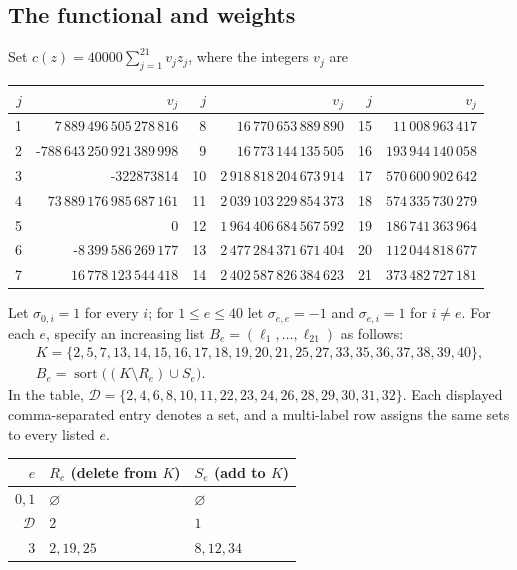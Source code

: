 \documentclass[11pt]{article}
\theoremstyle{remark}
\begin{document}
\begin{appendices}
\subsection*{The functional and weights}
Set $c(z)=40000\sum_{j=1}^{21}v_jz_j$, where the integers $v_j$ are
\begin{center}\small
\setlength{\tabcolsep}{5pt}
\begin{tabular}{r r|r r|r r}
$j$&$v_j$&$j$&$v_j$&$j$&$v_j$\\\hline
1&$7\,889\,496\,505\,278\,816$&8&$16\,770\,653\,889\,890$&15&$11\,008\,963\,417$\\
2&-$788\,643\,250\,921\,389\,998$&9&$16\,773\,144\,135\,505$&16&$193\,944\,140\,058$\\
3&-322873814&10&$2\,918\,818\,204\,673\,914$&17&$570\,600\,902\,642$\\
4&$73\,889\,176\,985\,687\,161$&11&$2\,039\,103\,229\,854\,373$&18&$574\,335\,730\,279$\\
5&0&12&$1\,964\,406\,684\,567\,592$&19&$186\,741\,363\,964$\\
6&-$8\,399\,586\,269\,177$&13&$2\,477\,284\,371\,671\,404$&20&$112\,044\,818\,677$\\
7&$16\,778\,123\,544\,418$&14&$2\,402\,587\,826\,384\,623$&21&$373\,482\,727\,181$\\
\end{tabular}
\end{center}
Let $\sigma_{0,i}=1$ for every $i$; for $1\le e\le40$ let
$\sigma_{e,e}=-1$ and $\sigma_{e,i}=1$ for $i\ne e$.
For each $e$, specify an increasing list $B_e=(\ell_1,\ldots,\ell_{21})$ as follows:
\[
 \begin{gathered}
 K=\{2,5,7,13,14,15,16,17,18,19,20,21,25,27,33,35,36,37,38,39,40\},\\
 B_e=\operatorname{sort}\bigl((K\setminus R_e)\cup S_e\bigr).
 \end{gathered}
\]
In the table, $\mathcal D=\{2,4,6,8,10,11,22,23,24,26,28,29,30,31,32\}$.
Each displayed comma-separated entry denotes a set, and a multi-label row
assigns the same sets to every listed $e$.
\begin{center}\scriptsize
\setlength{\tabcolsep}{14pt}
\renewcommand{\arraystretch}{1.03}
\begin{tabular}{r|l|l}
$e$&$R_e$ (delete from $K$)&$S_e$ (add to $K$)\\\hline
$0,1$&$\varnothing$&$\varnothing$\\
$\mathcal D$&$2$&$1$\\
$3$&$2,19,25$&$8,12,34$\\

\end{tabular}
\end{center}
\end{appendices}
\end{document}
